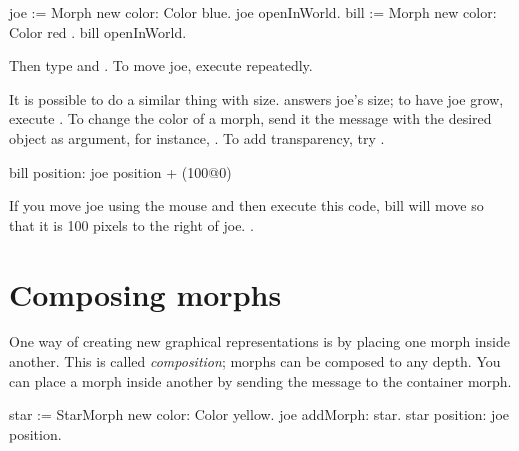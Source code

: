 \documentclass[a4paper,10pt,twoside]{book}
\begin{document}
\begin{code}{}
joe := Morph new color: Color blue.
joe openInWorld.
bill := Morph new color: Color red .
bill openInWorld.
\end{code}
\noindent
Then type  and .
To move joe, execute  repeatedly.

It is possible to do a similar thing with size.
  answers joe's size; to have joe grow, execute .
To change the color of a morph, send it the  message with the desired  object as argument, for instance, .
To add transparency, try .

\begin{code}{}
bill position: joe position + (100@0)
\end{code}
\noindent
If you move joe using the mouse and then execute this code, bill will move so that it is 100 pixels to the right of joe.
.

\section{Composing morphs}

One way of creating new graphical representations is by placing one morph inside another.
This is called \emph{composition}; morphs can be composed to any depth.
%
You can place a morph inside another by sending the message  to the container morph.

\begin{code}{}
star := StarMorph new color: Color yellow.
joe addMorph: star.
star position: joe position.
\end{code}
\end{document}
